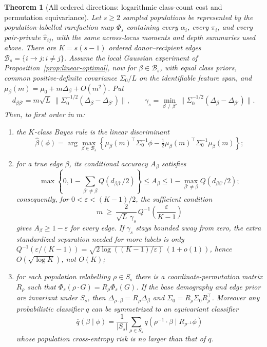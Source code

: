 \documentclass[11pt]{article}
\theoremstyle{plain}
\newtheorem{thm}{Theorem}[section]
\theoremstyle{definition}
\theoremstyle{remark}
\begin{document}
\begin{thm}[All ordered directions: logarithmic class-count cost and permutation equivariance]
\label{thm:many-directions}
Let $s\ge2$ sampled populations be represented by the population-labelled rarefaction map
$\Phi_s$ containing every $\alpha_i$, every $\pi_i$, and every pair-private
$\widehat\pi_{ij}$, with the same across-locus moments and depth summaries used above. There are
$K=s(s-1)$ ordered donor--recipient edges $\mathcal B_s=\{i\!\to\!j:i\ne j\}$. Assume the local
Gaussian experiment of Proposition~\ref{prop:linear-optimal}, now for
$\beta\in\mathcal B_s$, with equal class priors, common positive-definite covariance
$\Sigma_0/L$ on the identifiable feature span, and
$\mu_\beta(m)=\mu_0+m\Delta_\beta+O(m^2)$. Put
\[
 d_{\beta\beta'}=m\sqrt L\,
 \big\|\Sigma_0^{-1/2}(\Delta_\beta-\Delta_{\beta'})\big\|,
 \qquad
 \gamma_s=\min_{\beta\ne\beta'}
 \big\|\Sigma_0^{-1/2}(\Delta_\beta-\Delta_{\beta'})\big\|.
\]
Then, to first order in $m$:
\begin{enumerate}
\item the $K$-class Bayes rule is the linear discriminant
\[
 \widehat\beta(\phi)=\arg\max_{\beta\in\mathcal B_s}
 \left\{\mu_\beta(m)^\top\Sigma_0^{-1}\phi
 -\tfrac12\mu_\beta(m)^\top\Sigma_0^{-1}\mu_\beta(m)\right\};
\]
\item for a true edge $\beta$, its conditional accuracy $A_\beta$ satisfies
\[
 \max\!\left\{0,1-\!\sum_{\beta'\ne\beta}Q(d_{\beta\beta'}/2)\right\}
 \le A_\beta
 \le 1-\max_{\beta'\ne\beta}Q(d_{\beta\beta'}/2);
\]
consequently, for $0<\varepsilon<(K-1)/2$, the sufficient condition
\begin{equation}
 m\ \ge\ \frac{2}{\sqrt L\,\gamma_s}\,
 Q^{-1}\!\left(\frac{\varepsilon}{K-1}\right)
 \label{eq:many-direction-threshold}
\end{equation}
gives $A_\beta\ge1-\varepsilon$ for every edge. If $\gamma_s$ stays bounded away from zero,
the extra standardized separation needed for more labels is only
$Q^{-1}(\varepsilon/(K-1))=\sqrt{2\log((K-1)/\varepsilon)}\,(1+o(1))$, hence
$O(\sqrt{\log K})$, not $O(K)$;
\item for each population relabelling $\rho\in S_s$ there is a coordinate-permutation matrix
$R_\rho$ such that $\Phi_s(\rho\cdot G)=R_\rho\Phi_s(G)$. If the base demography and edge prior
are invariant under $S_s$, then $\Delta_{\rho\cdot\beta}=R_\rho\Delta_\beta$ and
$\Sigma_0=R_\rho\Sigma_0R_\rho^\top$. Moreover any probabilistic classifier $q$ can be
symmetrized to an equivariant classifier
\[
 \overline q(\beta\mid\phi)=\frac1{|S_s|}\sum_{\rho\in S_s}
 q(\rho^{-1}\!\cdot\beta\mid R_{\rho^{-1}}\phi)
\]
whose population cross-entropy risk is no larger than that of $q$.
\end{enumerate}
\end{thm}
\end{document}
